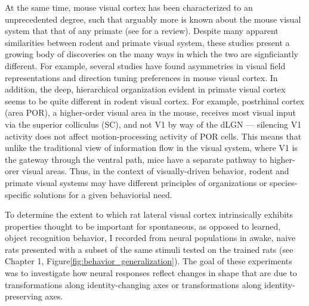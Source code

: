At the same time, mouse visual cortex has been characterized to an unprecedented degree, such that arguably more is known about the mouse visual system that that of any primate (see \citet{Niell2021} for a review). Despite many apparent similarities between rodent and primate visual system, these studies present a growing body of discoveries on the many ways in which the two are signficiantly different. For example, several studies have found asymmetries in visual field representations and direction tuning preferences in mouse visual cortex\cite{Zhuang2017, Liang2018, Sit2020, Murgas2020}. In addition, the deep, hierarchical organization evident in primate visual cortex seems to be quite different in rodent visual cortex. For example, postrhinal cortex (area POR), a higher-order visual area in the mouse, receives most visual input via the superior colliculus (SC), and not V1 by way of the dLGN --- silencing V1 activity does not affect motion-processing activity of POR cells\cite{Beltramo2019a}. This means that unlike the traditional view of information flow in the visual system, where V1 is the gateway through the ventral path, mice have a separate pathway to higher-orer visual areas. Thus, in the context of visually-driven behavior, rodent and primate visual systems may have different principles of organizations or species-specific solutions for a given behaviorial need. 

To determine the extent to which rat lateral visual cortex intrinsically exhibits properties thought to be important for spontaneous, as opposed to learned, object recognition behavior, I recorded from neural populations in awake, naive rats presented with a subset of the same stimuli tested on the trained rats (see Chapter 1, Figure\ref{fig:behavior_generalization}). The goal of these experiments was to investigate how neural responses reflect changes in shape that are due to transformations along identity-changing axes or transformations along identity-preserving axes.

